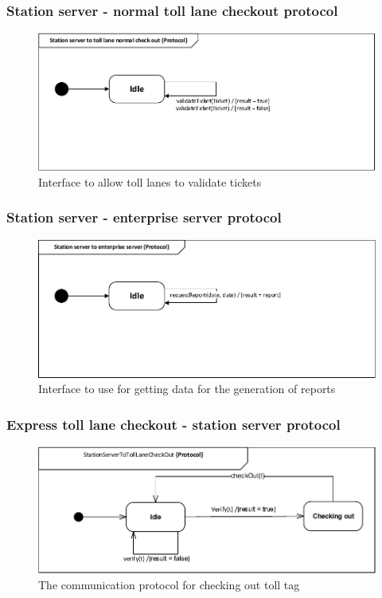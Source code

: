\subsubsection*{Station server - normal toll lane checkout protocol}
\begin{figure}[H]
\centering
\includegraphics[width=0.7\linewidth]{img/behaviour_state_machines/protocol_state_machines/protocol_state_machine_station_server_to_normal_lane_check_out}
\caption{Interface to allow toll lanes to validate tickets}
\label{fig:protocol_state_machine_station_server_to_normal_lane_check_out}
\end{figure}

\subsubsection*{Station server - enterprise server protocol}
\begin{figure}[H]
\centering
\includegraphics[width=0.7\linewidth]{img/behaviour_state_machines/protocol_state_machines/protocol_state_machine_station_server_to_enterprise_server}
\caption{Interface to use for getting data for the generation of reports}
\label{fig:protocol_state_machine_station_server_to_enterprise_server}
\end{figure}

\subsubsection*{Express toll lane checkout - station server protocol}
\begin{figure}[H]
\centering
\includegraphics[width=0.7\linewidth]{img/behaviour_state_machines/protocol_state_machines/protocol_state_machine_station_server_with_toll_computer_check_out}
\caption{The communication protocol for checking out toll tag}
\label{fig:protocol_state_machine_station_server with_toll_computer_check_out}
\end{figure}

